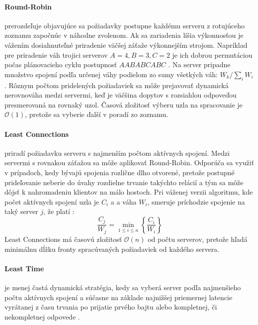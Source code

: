 \documentclass[12pt, a4paper]{article}
\begin{document}
\paragraph{Round-Robin} prerozdeľuje objavujúce sa požiadavky postupne každému serveru z 
rotujúceho zoznamu započnúc v náhodne zvolenom. Ak sa zariadenia líšia výkonnosťou je vážením dosiahnuteľné
priradenie väčšej záťaže výkonnejším strojom. Napríklad pre priradenie váh trojici serverov $A=4, B=3, C=2$ 
je ich dobrou permutáciou počas plánovacieho cyklu postupnosť $AABABCABC$  \cite{LVS}. Na server pripadne 
množstvo spojení podľa určenej váhy podielom zo sumy všetkých váh: $W_k / \sum_i{W_i}$. Rôznym počtom 
pridelených požiadaviek sa môže prejavovať dynamická nerovnováha medzi servermi, keď je väčšina dopytov s 
rozsiahlou odpoveďou presmerovaná na rovnaký uzol. Časová zložitosť výberu uzla na spracovanie
je $\mathcal{O}(1)$, pretože sa vyberie ďalší v poradí zo zoznamu.

\paragraph{Least Connections} priradí požiadavku serveru s najmenším počtom aktívnych spojení. Medzi
servermi s rovnakou záťažou sa môže aplikovať Round-Robin. Odporúča sa využiť v prípadoch, kedy bývajú
spojenia rozlične dlho otvorené, pretože postupné prideľovanie neberie do úvahy rozdielne trvanie takýchto 
relácií a tým sa môže dôjsť k nahromadeniu klientov na málo hostoch. Pri váženej verzii algoritmu, kde
počet aktívnych spojení uzla je $C_i$ a a váha $W_i$, smeruje príchodzie spojenie na taký server $j$, že platí \cite{LVS}: $$\frac{C_j}{W_j} = \min_{1 \leq i \leq n}{\left\{\frac{C_i}{W_i}\right\}}$$
Least Connections má časovú zložitosť $\mathcal{O}(n)$ od počtu serverov, pretože hľadá minimálnu
dĺžku fronty spracúvaných požiadaviek od každého servera. 

\paragraph{Least Time} je menej častá dynamická stratégia, kedy sa vyberá server podľa najmenšieho počtu 
aktívnych spojení a súčasne na základe najnižšej priemernej latencie vyrátanej z času trvania po prijatie
prvého bajtu alebo kompletnej, či nekompletnej odpovede \cite{nginx-http-balancer}.
\end{document}
